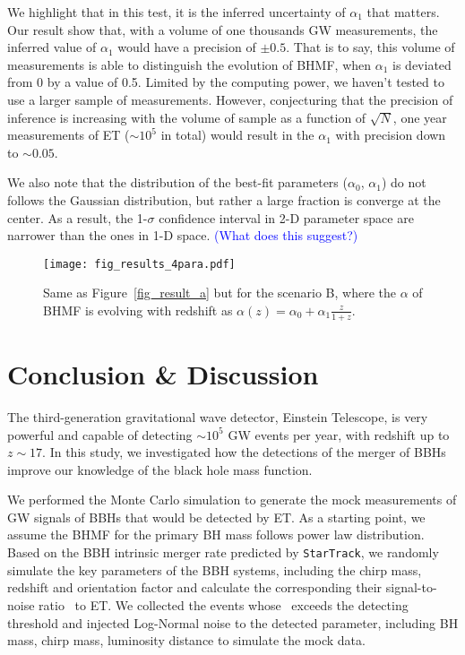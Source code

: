 \documentclass[twocolumn]{aastex62}
\begin{document}
We highlight that in this test, it is the inferred uncertainty of $\alpha_1$ that matters. Our result show that, with a volume of one thousands GW measurements, the inferred value of $\alpha_1$ would have a precision of $\pm0.5$. That is to say, this volume of measurements is able to distinguish the evolution of BHMF, when $\alpha_1$ is deviated from 0 by a value of 0.5. Limited by the computing power, we haven't tested to use a larger sample of measurements. However, conjecturing that the precision of inference is increasing with the volume of sample as a function of $\sqrt{N}$, one year measurements of ET ($\sim10^5$ in total) would result in the $\alpha_1$ with precision down to $\sim0.05$.

We also note that the distribution of the best-fit parameters ($\alpha_0$, $\alpha_1$) do not follows the Gaussian distribution, but rather a large fraction is converge at the center. As a result, the 1-$\sigma$ confidence interval in 2-D parameter space are narrower than the ones in 1-D space. \textcolor{blue}{(What does this suggest?)} 

\begin{figure}%
\texttt{[image: fig\_results\_4para.pdf]}
\caption{
Same as Figure~\ref{fig_result_a} but for the scenario B, where the $\alpha$ of BHMF is evolving with redshift as $\alpha(z) = \alpha_0 + \alpha_1\frac{z}{1+z}$. 
}
\label{fig_result_b}
\end{figure}

\vspace{1cm}
\section{Conclusion \& Discussion} \label{sec_summary}
The third-generation gravitational wave detector, Einstein Telescope, is very powerful and capable of detecting $\sim10^5$ GW events per year, with redshift up to $z\sim17$. In this study, we investigated how the detections of the merger of BBHs improve our knowledge of the black hole mass function.

We performed the Monte Carlo simulation to generate the mock measurements of GW signals of BBHs that would be detected by ET. As a starting point, we assume the BHMF for the primary BH mass follows power law distribution. Based on the BBH intrinsic merger rate predicted by {\tt StarTrack}, we randomly simulate the key parameters of the BBH systems, including the chirp mass, redshift and orientation factor and calculate the corresponding their signal-to-noise ratio \snr\ to ET. We collected the events whose \snr\ exceeds the detecting threshold and injected Log-Normal noise to the detected parameter, including BH mass, chirp mass, luminosity distance to simulate the mock data.
\end{document}
